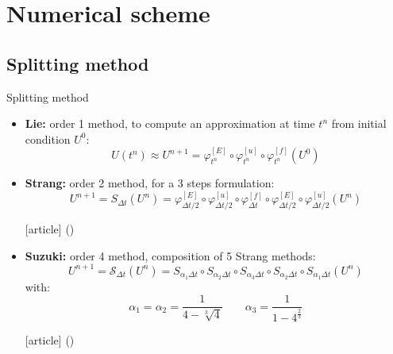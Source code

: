 \documentclass{beamer}
\newcommand{\mbold}[1]{{\textbf{\color{PLB}#1}}}
\newcommand{\customcite}[1]{\citeauthor{#1} (\citeyear{#1})}
\begin{document}
\section{Numerical scheme}

\subsection{Splitting method}
\begin{frame}{Splitting method}
  \begin{itemize}
    \item \mbold{Lie:} order 1 method, to compute an approximation at time $t^n$ from initial condition $U^0$: $$U(t^n)\approx U^{n+1} = \varphi^{[E]}_{t^n} \circ \varphi^{[u]}_{t^n} \circ \varphi^{[f]}_{t^n}(U^0)$$
    \item \mbold{Strang:} order 2 method, for a 3 steps formulation: $$U^{n+1} = S_{\Delta t}(U^n) = \varphi^{[E]}_{\Delta t/2} \circ \varphi^{[u]}_{\Delta t/2} \circ \varphi^{[f]}_{\Delta t} \circ \varphi^{[E]}_{\Delta t/2} \circ \varphi^{[u]}_{\Delta t/2} (U^n) $$ \begin{thebibliography}{9}
    [article]
     \customcite{Strang:1968}
  \end{thebibliography}
    \item \mbold{Suzuki:} order 4 method, composition of 5 Strang methods: $$
      U^{n+1} = \mathcal{S}_{\Delta t}(U^n) = S_{\alpha_1\Delta t} \circ S_{\alpha_2\Delta t} \circ S_{\alpha_3\Delta t} \circ S_{\alpha_2\Delta t} \circ S_{\alpha_1\Delta t} (U^n)
    $$with: $$ \alpha_1 = \alpha_2 = \frac{1}{4 - \sqrt[3]{4}} \qquad \alpha_3 = \frac{1}{1- 4^{\frac{2}{3}}}$$ \begin{thebibliography}{9}
    [article]
     \customcite{Suzuki:1990}
  \end{thebibliography}
  \end{itemize}
\end{frame}
\end{document}
